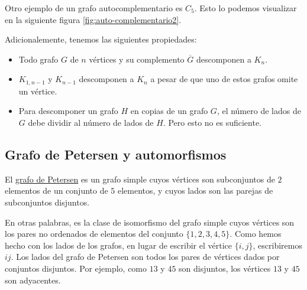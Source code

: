 \begin{ejem}
    Otro ejemplo de un grafo autocomplementario es $C_5$. Esto lo podemos visualizar en la siguiente figura \ref{fig:auto-complementario2}.
    
    \begin{marginfigure}
        \centering
        \caption{}
        \label{fig:auto-complementario2}
    \end{marginfigure}
\end{ejem}

Adicionalemente, tenemos las siguientes propiedades:

\begin{itemize}
    \item Todo grafo $G$ de $n$ vértices y su complemento $\overline{G}$ descomponen a $K_n$.
    \item $K_{1,n-1}$ y $K_{n-1}$ descomponen a $K_n$ a pesar de que uno de estos grafos omite un vértice.
    \item Para descomponer un grafo $H$ en copias de un grafo $G$, el número de lados de $G$ debe dividir al número de lados de $H$. Pero esto no es suficiente.
\end{itemize}

\subsection{Grafo de Petersen y automorfismos}

\begin{defn}
    El \ul{grafo de Petersen} es un grafo simple cuyos vértices son subconjuntos de $2$ elementos de un conjunto de $5$ elementos, y cuyos lados son las parejas de subconjuntos disjuntos.
    
    En otras palabras, es la clase de isomorfismo del grafo simple cuyos vértices son los pares no ordenados de elementos del conjunto $\{1,2,3,4,5\}$. Como hemos hecho con los lados de los grafos, en lugar de escribir el vértice $\{i,j\}$, escribiremos $ij$. Los lados del grafo de Petersen son todos los pares de vértices dados por conjuntos disjuntos. Por ejemplo, como $13$ y $45$ son disjuntos, los vértices $13$ y $45$ son adyacentes.
\end{defn}

